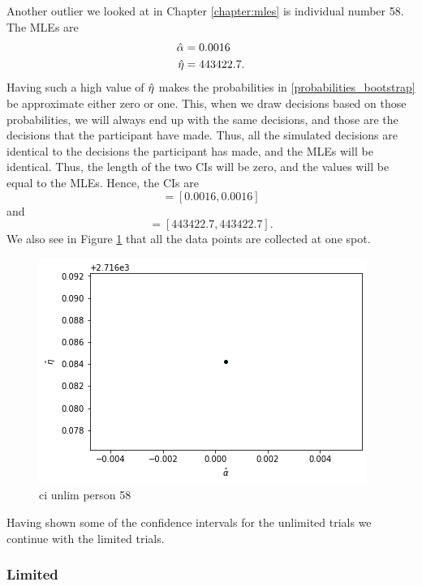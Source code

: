 Another outlier we looked at in Chapter \ref{chapter:mles} is individual number 58. The MLEs are 
\begin{equation*}
    \begin{aligned}
        \hat{\alpha} &= 0.0016\\
        \hat{\eta} &= 443422.7.
    \end{aligned}
\end{equation*}
Having such a high value of $\hat{\eta}$ makes the probabilities in \eqref{probabilities_bootstrap} be approximate either zero or one. This, when we draw decisions based on those probabilities, we will always end up with the same decisions, and those are the decisions that the participant have made. Thus, all the simulated decisions are identical to the decisions the participant has made, and the MLEs will be identical. Thus, the length of the two CIs will be zero, and the values will be equal to the MLEs. Hence, the CIs are
\begin{equation*}
    [\hat{\alpha}^{*(5)}_{1000},\hat{\alpha}^{*(95)}_{1000}] = [0.0016,0.0016]
\end{equation*}
and
\begin{equation*}
    [\hat{\eta}^{*(5)}_{1000},\hat{\eta}^{*(95)}_{1000}] = [443422.7,443422.7].
\end{equation*}
We also see in Figure \ref{fig:ci_unlim_person_58} that all the data points are collected at one spot. 
\begin{figure}
    \centering
    \includegraphics[scale=0.7]{pictures/ci_unlim_person58.png}
    \caption{ci unlim person 58}
    \label{fig:ci_unlim_person_58}
\end{figure}

Having shown some of the confidence intervals for the unlimited trials we continue with the limited trials.

\subsubsection{Limited}

